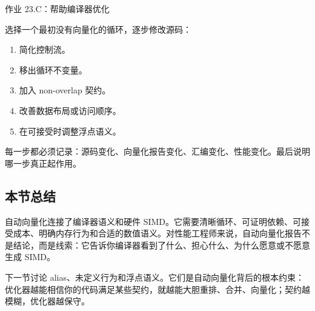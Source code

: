 \begin{exercisebox}
作业 23.C：帮助编译器优化

选择一个最初没有向量化的循环，逐步修改源码：

\begin{enumerate}
  \item 简化控制流。
  \item 移出循环不变量。
  \item 加入 non-overlap 契约。
  \item 改善数据布局或访问顺序。
  \item 在可接受时调整浮点语义。
\end{enumerate}

每一步都必须记录：源码变化、向量化报告变化、汇编变化、性能变化。最后说明哪一步真正起作用。
\end{exercisebox}

\subsection{本节总结}

自动向量化连接了编译器语义和硬件 SIMD。它需要清晰循环、可证明依赖、可接受成本、明确内存行为和合适的数值语义。对性能工程师来说，自动向量化报告不是结论，而是线索：它告诉你编译器看到了什么、担心什么、为什么愿意或不愿意生成 SIMD。

下一节讨论 alias、未定义行为和浮点语义。它们是自动向量化背后的根本约束：优化器越能相信你的代码满足某些契约，就越能大胆重排、合并、向量化；契约越模糊，优化器越保守。
